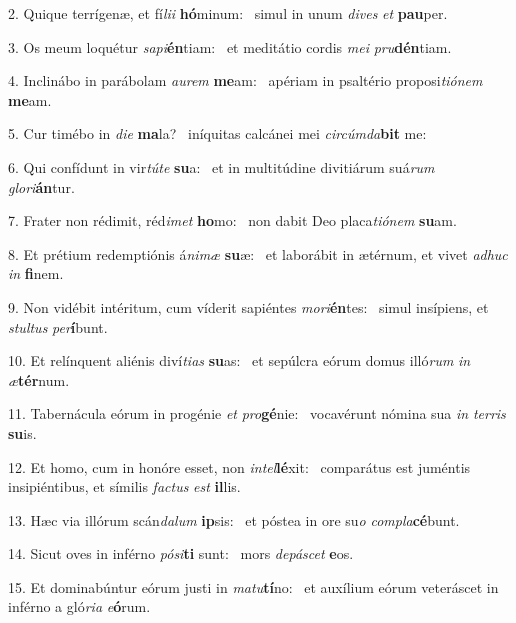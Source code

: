 2. Quique terrígenæ, et fí\textit{li}\textit{i} \textbf{hó}minum: \ast\  simul in unum \textit{di}\textit{ves} \textit{et} \textbf{pau}per.\

3. Os meum loquétur \textit{sa}\textit{pi}\textbf{én}tiam: \ast\  et meditátio cordis \textit{me}\textit{i} \textit{pru}\textbf{dén}tiam.\

4. Inclinábo in parábolam \textit{au}\textit{rem} \textbf{me}am: \ast\  apériam in psaltério proposi\textit{ti}\textit{ó}\textit{nem} \textbf{me}am.\

5. Cur timébo in \textit{di}\textit{e} \textbf{ma}la? \ast\  iníquitas calcánei mei \textit{cir}\textit{cúm}\textit{da}\textbf{bit} me:\

6. Qui confídunt in vir\textit{tú}\textit{te} \textbf{su}a: \ast\  et in multitúdine divitiárum suá\textit{rum} \textit{glo}\textit{ri}\textbf{án}tur.\

7. Frater non rédimit, réd\textit{i}\textit{met} \textbf{ho}mo: \ast\  non dabit Deo placa\textit{ti}\textit{ó}\textit{nem} \textbf{su}am.\

8. Et prétium redemptiónis á\textit{ni}\textit{mæ} \textbf{su}æ: \ast\  et laborábit in ætérnum, et vivet \textit{ad}\textit{huc} \textit{in} \textbf{fi}nem.\

9. Non vidébit intéritum, cum víderit sapiéntes \textit{mo}\textit{ri}\textbf{én}tes: \ast\  simul insípiens, et \textit{stul}\textit{tus} \textit{per}\textbf{í}bunt.\

10. Et relínquent aliénis diví\textit{ti}\textit{as} \textbf{su}as: \ast\  et sepúlcra eórum domus illó\textit{rum} \textit{in} \textit{æ}\textbf{tér}num.\

11. Tabernácula eórum in progénie \textit{et} \textit{pro}\textbf{gé}nie: \ast\  vocavérunt nómina sua \textit{in} \textit{ter}\textit{ris} \textbf{su}is.\

12. Et homo, cum in honóre esset, non \textit{in}\textit{tel}\textbf{lé}xit: \ast\  comparátus est juméntis insipiéntibus, et símilis \textit{fac}\textit{tus} \textit{est} \textbf{il}lis.\

13. Hæc via illórum scán\textit{da}\textit{lum} \textbf{ip}sis: \ast\  et póstea in ore su\textit{o} \textit{com}\textit{pla}\textbf{cé}bunt.\

14. Sicut oves in inférno \textit{pó}\textit{si}\textbf{ti} sunt: \ast\  mors \textit{de}\textit{pá}\textit{scet} \textbf{e}os.\

15. Et dominabúntur eórum justi in \textit{ma}\textit{tu}\textbf{tí}no: \ast\  et auxílium eórum veteráscet in inférno a gló\textit{ri}\textit{a} \textit{e}\textbf{ó}rum.\

